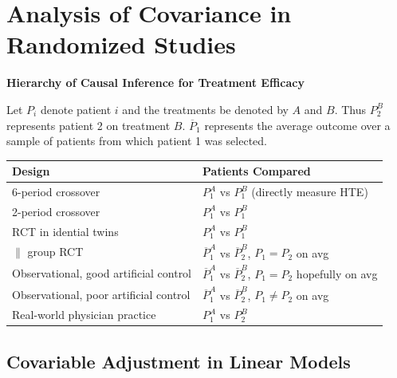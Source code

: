 

\def\apacue{1}
\chapter{Analysis of Covariance in Randomized Studies}

{\smaller[-1] \textbf{Hierarchy of Causal Inference for Treatment Efficacy}}

\bigskip

Let $P_{i}$ denote patient $i$ and the treatments be denoted by $A$
and $B$.  Thus $P_{2}^{B}$ represents patient 2 on treatment $B$.
$\overline{P}_{1}$ represents the average outcome over a sample of
patients from which patient 1 was selected.

\medskip

\begin{tabular}{ll}
\textbf{Design} & \textbf{Patients Compared} \\ \hline
6-period crossover & $P_{1}^{A}$ vs $P_{1}^{B}$ (directly measure HTE)\\
2-period crossover & $P_{1}^{A}$ vs $P_{1}^{B}$ \\
RCT in idential twins & $P_{1}^{A}$ vs $P_{1}^{B}$ \\
$\parallel$ group RCT & $\overline{P}_{1}^{A}$ vs $\overline{P}_{2}^{B}$, 
$P_{1}=P_{2}$ on avg \\
Observational, good artificial control & $\overline{P}_{1}^{A}$ vs 
$\overline{P}_{2}^{B}$, $P_{1}=P_{2}$ hopefully on avg\\
Observational, poor artificial control & $\overline{P}_{1}^{A}$ vs 
$\overline{P}_{2}^{B}$, $P_{1}\neq P_{2}$ on avg\\
Real-world physician practice & $P_{1}^{A}$ vs $P_{2}^{B}$ \\
 \hline
\end{tabular}


\section{Covariable Adjustment in Linear
  Models} 


